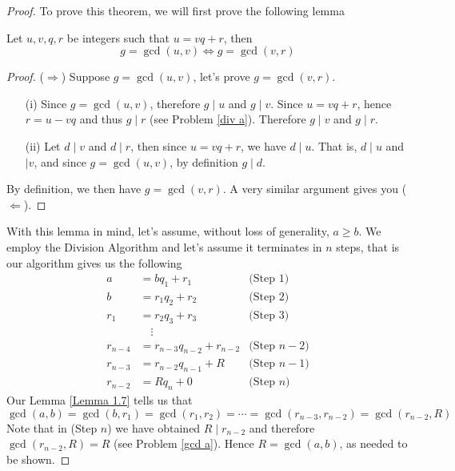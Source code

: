 \begin{proof}
To prove this theorem, we will first prove the following lemma\\
\begin{subproof}
\vspace*{-0.1in}
\begin{lemma}\label{Lemma 1.7}
Let $u,v,q,r$ be integers such that $u = vq + r$, then
\[g = \gcd(u,v) \iff g = \gcd(v,r)\]
\end{lemma}
\begin{proof}
($\Rightarrow$) Suppose $g = \gcd(u,v)$, let's prove $g = \gcd(v,r)$.
\begin{itemize}
\item[(i)] Since $g = \gcd(u,v)$, therefore $g\mid u$ and $g\mid v$. Since $u = vq + r$, hence $r = u - vq$ and thus $g\mid r$ (see Problem \ref{div a}). Therefore $g\mid v$ and $g\mid r$.
\item[(ii)] Let $d\mid v$ and $d\mid r$, then since $u = vq + r$, we have $d\mid u$. That is, $d\mid u$ and $\mid v$, and since $g = \gcd(u,v)$, by definition $g\mid d$.
\end{itemize}
By definition, we then have $g = \gcd(v,r)$. A very similar argument gives you ($\Leftarrow$).
\end{proof}
\vspace*{0.01em}
\end{subproof}
\vspace*{0.5em}
With this lemma in mind, let's assume, without loss of generality, $a\geq b$. We employ the Division Algorithm and let's assume it terminates in $n$ steps, that is our algorithm gives us the following
\begin{align*}
a &= bq_1 + r_1 & \text{(Step 1)}\\[0.25em]
b &= r_1q_2 + r_2 & \text{(Step 2)}\\[0.25em]
r_1 &= r_2q_3 + r_3 & \text{(Step 3)}\\[0.25em]
&\quad\vdots\\[0.25em]
r_{n-4} &= r_{n-3}q_{n-2} + r_{n-2} & \text{(Step $n-2$)}\\[0.25em]
r_{n-3} &= r_{n-2}q_{n-1} + R & \text{(Step $n-1$)}\\[0.25em]
r_{n-2} &= Rq_n + 0 & \text{(Step $n$)}
\end{align*}
Our Lemma \ref{Lemma 1.7} tells us that
\[\gcd(a,b) = \gcd(b,r_1) = \gcd(r_1,r_2) = \cdots = \gcd(r_{n-3},r_{n-2}) = \gcd(r_{n-2},R)\]
Note that in (Step $n$) we have obtained $R\mid r_{n-2}$ and therefore $\gcd(r_{n-2},R) = R$ (see Problem \ref{gcd a}). Hence $R = \gcd(a,b)$, as needed to be shown.
\end{proof}

